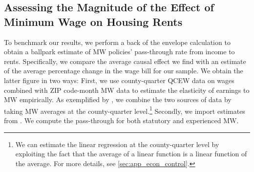 \subsection{Assessing the Magnitude of the Effect of Minimum Wage on Housing Rents}\label{sec:discussion_benchmarking}
To benchmark our results, we perform a back of the envelope calculation to obtain a ballpark 
estimate of MW policies' pass-through rate from income to rents. Specifically, we compare the average 
causal effect we find with an estimate of the average percentage change in the wage 
bill for our sample. We obtain the latter figure in two ways: 
First, we use county-quarter QCEW data on wages 
combined with ZIP code-month MW data to estimate the elasticity of earnings to MW empirically. 
As exemplified by \textcite{gentzkow2015newspapers}, we combine the two sources of data by 
taking MW averages at the county-quarter level.\footnote{We can estimate the linear 
	regression at the county-quarter level by exploiting the fact that the average of a linear 
	function is a linear function of the average. For more details, see \autoref{sec:app_econ_control}.} 
Secondly, we import estimates from \textcite{CegnizEtAl2019}. We compute the pass-through for
both statutory and experienced MW. 




